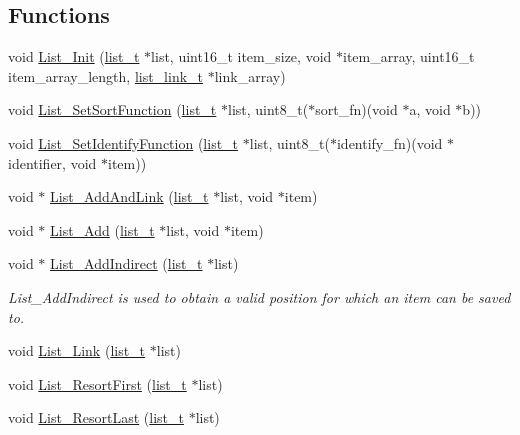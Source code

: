 \subsection*{Functions}
\begin{DoxyCompactItemize}
\item 
void \hyperlink{group__list_gacc707ed1f1ffdb563d26a5197786fbcb}{List\+\_\+\+Init} (\hyperlink{structlist__t}{list\+\_\+t} $\ast$list, uint16\+\_\+t item\+\_\+size, void $\ast$item\+\_\+array, uint16\+\_\+t item\+\_\+array\+\_\+length, \hyperlink{structlist__link__t}{list\+\_\+link\+\_\+t} $\ast$link\+\_\+array)
\item 
void \hyperlink{group__list_ga61c9a347e890a26159c3fa0cb567ae68}{List\+\_\+\+Set\+Sort\+Function} (\hyperlink{structlist__t}{list\+\_\+t} $\ast$list, uint8\+\_\+t($\ast$sort\+\_\+fn)(void $\ast$a, void $\ast$b))
\item 
void \hyperlink{group__list_ga41266aadaf8ad04a1bf043637bb6eb86}{List\+\_\+\+Set\+Identify\+Function} (\hyperlink{structlist__t}{list\+\_\+t} $\ast$list, uint8\+\_\+t($\ast$identify\+\_\+fn)(void $\ast$identifier, void $\ast$item))
\item 
void $\ast$ \hyperlink{group__list_gace91195eb28d548f091202d8a8fff06b}{List\+\_\+\+Add\+And\+Link} (\hyperlink{structlist__t}{list\+\_\+t} $\ast$list, void $\ast$item)
\item 
void $\ast$ \hyperlink{group__list_ga26a446933466c8a9ecc7a86ffec8356e}{List\+\_\+\+Add} (\hyperlink{structlist__t}{list\+\_\+t} $\ast$list, void $\ast$item)
\item 
void $\ast$ \hyperlink{group__list_ga1a8339a388bfff7c959d5487ac829cd1}{List\+\_\+\+Add\+Indirect} (\hyperlink{structlist__t}{list\+\_\+t} $\ast$list)
\begin{DoxyCompactList}\small\item\em List\+\_\+\+Add\+Indirect is used to obtain a valid position for which an item can be saved to. \end{DoxyCompactList}\item 
void \hyperlink{group__list_ga645d81a49b82c4009487089fd4f98338}{List\+\_\+\+Link} (\hyperlink{structlist__t}{list\+\_\+t} $\ast$list)
\item 
void \hyperlink{group__list_ga36dab9276628d1025b55b1fb43a3d0d6}{List\+\_\+\+Resort\+First} (\hyperlink{structlist__t}{list\+\_\+t} $\ast$list)
\item 
void \hyperlink{group__list_ga616d771c42c25750ea9b4c14c4df8c9c}{List\+\_\+\+Resort\+Last} (\hyperlink{structlist__t}{list\+\_\+t} $\ast$list)
\item 

\end{DoxyCompactItemize}
